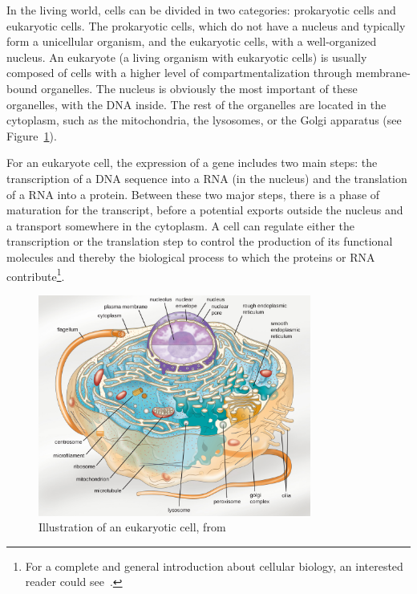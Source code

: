 In the living world, cells can be divided in two categories: prokaryotic cells and eukaryotic cells.
The prokaryotic cells, which do not have a nucleus and typically form a unicellular organism, and the eukaryotic cells, with a well-organized nucleus.
An eukaryote (a living organism with eukaryotic cells) is usually composed of cells with a higher level of compartmentalization through membrane-bound organelles.
The nucleus is obviously the most important of these organelles, with the \ac{DNA} inside.
The rest of the organelles are located in the cytoplasm, such as the mitochondria, the lysosomes, or the Golgi apparatus (see Figure~\ref{fig:eukaryotic_cell}).

For an eukaryote cell, the expression of a gene includes two main steps: the transcription of a \ac{DNA} sequence into a \ac{RNA} (in the nucleus) and the translation of a \ac{RNA} into a protein.
Between these two major steps, there is a phase of maturation for the transcript, before a potential exports outside the nucleus and a transport somewhere in the cytoplasm.
A cell can regulate either the transcription or the translation step to control the production of its functional molecules and thereby the biological process to which the proteins or \ac{RNA} contribute\footnote{For a complete and general introduction about cellular biology, an interested reader could see~\cite{alberts_molecular_2017}.}.

\begin{figure}[]
    \centering
    \includegraphics[width=0.8\textwidth]{figures/introduction/cell_eukaryotic.jpg}
    \caption[Eukariotic cell]{Illustration of an eukaryotic cell, from~\cite{parker2017microbiology}}
    \label{fig:eukaryotic_cell}
\end{figure}

